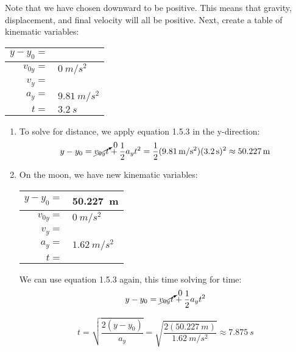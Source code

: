 \begin{mdframed}[backgroundcolor=blue!10!white]
	
	\vspace{0.1 in}
	Note that we have chosen downward to be positive.  This means that gravity, displacement, and final velocity will all be positive.  Next, create a table of kinematic variables:
	
	\begin{center}
		\begin{tabular}{| r  l |}
			\hline
			$y-y_0 =$ & \\
			\hline
			$v_{0y} = $ & $\SI{0}{m/s^2}$ \\
			\hline
			$v_y = $ & \\
			\hline
			$a_y = $ & $\SI{9.81}{m/s^2}$ \\
			\hline
			$t = $ &$\SI{3.2}{s}$ \\
			\hline
		\end{tabular}
	\end{center}
	
	
	
	\begin{enumerate}[label=\alph*.]
		
		
		\item To solve for distance, we apply equation 1.5.3 in the y-direction:
		\begin{equation*}
		y-y_0 = \cancelto{0}{v_{0y}t} + \frac{1}{2}a_yt^2 = \frac{1}{2}(\SI{9.81}{m/s^2})(\SI{3.2}{s})^2 \approx \SI{50.227}{m}
		\end{equation*}
		
		\item On the moon, we have new kinematic variables:
			\begin{center}
			\begin{tabular}{| r  l |}
				\hline
				$y-y_0 =$ &\SI{50.227}{m} \\
				\hline
				$v_{0y} = $ & $\SI{0}{m/s^2}$ \\
				\hline
				$v_y = $ & \\
				\hline
				$a_y = $ & $\SI{1.62}{m/s^2}$ \\
				\hline
				$t = $ & \\
				\hline
			\end{tabular}
		\end{center}
		
		We can use equation 1.5.3 again, this time solving for time:
			\begin{equation*}
		y-y_0 = \cancelto{0}{v_{0y}t} + \frac{1}{2}a_yt^2 
		\end{equation*}
		
		\begin{equation*}
		 t = \sqrt{\frac{2(y-y_0)}{a_y}} = \sqrt{\frac{2(\SI{50.227}{m})}{\SI{1.62}{m/s^2}}} \approx \SI{7.875}{s}
		\end{equation*}
		
		
	\end{enumerate}
\end{mdframed}




